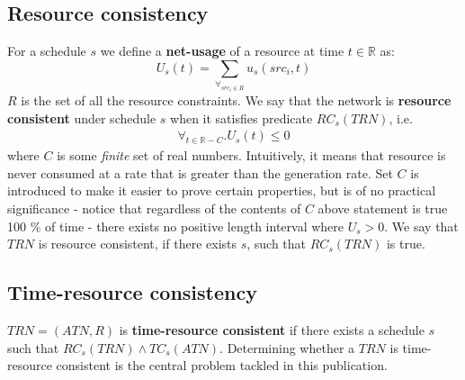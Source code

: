 \subsection{Resource consistency}
For a schedule $s$ we define a \textbf{net-usage} of a resource at time $t \in \mathbb{R}$ as:
\[
U_s(t) = \sum_{\forall_{src_i \in R}} u_s(src_i, t)
\]
$R$ is the set of all the resource constraints. We say that the network is \textbf{resource consistent} under schedule $s$ when it satisfies predicate $RC_s(TRN)$, i.e.
\begin{align}
\label{usage_for_all}\forall_{t \in {\mathbb{R} - C}} . U_s(t) \leq 0
\end{align}
where $C$ is some \textit{finite} set of real numbers. Intuitively, it means that resource is never consumed at a rate that is greater than the generation rate. Set $C$ is introduced to make it easier to prove certain properties, but is of no practical significance - notice that regardless of the contents of $C$ above statement is true 100 \% of time - there exists no positive length interval where $U_s > 0$. We say that $TRN$ is resource consistent, if there exists $s$, such that $RC_s(TRN)$ is true.

\subsection{Time-resource consistency}
$TRN=(ATN, R)$ is \textbf{time-resource consistent} if there exists a schedule $s$ such that $RC_s(TRN) \wedge TC_s(ATN)$. Determining whether a $TRN$ is time-resource consistent is the central problem tackled in this publication.

